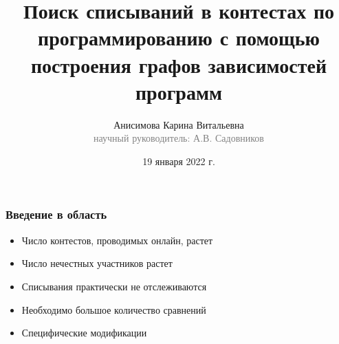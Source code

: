 \documentclass[10pt]{beamer}
\begin{document}
\title[Поиск списываний в контестах]{Поиск списываний в контестах по программированию с помощью построения графов зависимостей программ}

\author[Анисимова К.В.]{Анисимова Карина Витальевна\\{\footnotesize\textcolor{gray}{научный руководитель: А.В. Садовников}}}
\date{19 января 2022 г.}
\frame{\titlepage}

\begin{frame}[fragile]\frametitle{Введение в область}
	\begin{itemize}
		\item Число контестов, проводимых онлайн, растет
		\item Число нечестных участников растет
		\item Списывания практически не отслеживаются
		\item Необходимо большое количество сравнений
		\item Специфические модификации
	\end{itemize}
\end{frame}
\end{document}
